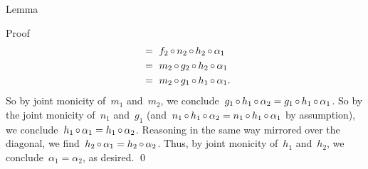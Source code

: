 \documentclass[b]{subfiles}
\begin{document}
\begin{parsec}
\begin{point}{Lemma}
\begin{point}{Proof}
\begin{align*}
    &\ =\  f_2 \mathop{\circ} n_2 \mathop{\circ} h_2 \mathop{\circ} \alpha_1 \\ 
    &\ =\  m_2 \mathop{\circ} g_2 \mathop{\circ} h_2 \mathop{\circ} \alpha_1 \\ 
    &\ =\  m_2 \mathop{\circ} g_1 \mathop{\circ} h_1 \mathop{\circ} \alpha_1.
\end{align*}
So by joint monicity of~$m_1$ and~$m_2$,
    we conclude~$g_1 \mathop{\circ} h_1 \mathop{\circ} \alpha_2
                = g_1 \mathop{\circ} h_1 \mathop{\circ} \alpha_1$.
So by the joint monicity of~$n_1$ and~$g_1$
    (and~$n_1 \mathop{\circ} h_1 \mathop{\circ} \alpha_2
    = n_1 \mathop{\circ} h_1 \mathop{\circ} \alpha_1$ by assumption),
    we conclude~$h_1 \mathop{\circ} \alpha_1 = h_1 \mathop{\circ} \alpha_2$.
Reasoning in the same way mirrored over the diagonal,
    we find~$h_2 \mathop{\circ} \alpha_1 = h_2 \mathop{\circ} \alpha_2$.
Thus, by joint monicity of~$h_1$ and~$h_2$, we conclude~$\alpha_1 = \alpha_2$, as desired. \qed
\end{point}
\end{point}
\end{parsec}
\end{document}
